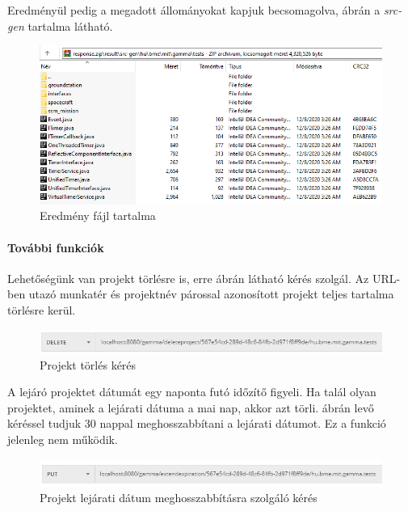 Eredményül pedig a megadott állományokat kapjuk becsomagolva,  ábrán a \textit{src-gen} tartalma látható. 

\begin{figure}[!ht]
	\includegraphics[width=150mm, keepaspectratio]{figures/result_zip.PNG}
	\caption{Eredmény fájl tartalma}
	\label{fig:result_zip}
\end{figure}
\paragraph{További funkciók} Lehetőségünk van projekt törlésre is, erre  ábrán látható kérés szolgál. Az URL-ben utazó munkatér és projektnév párossal azonosított projekt teljes tartalma törlésre kerül.


\begin{figure}[!ht]
	\includegraphics[width=\textwidth, keepaspectratio]{figures/delete_project_request.PNG}
	\caption{Projekt törlés kérés}
	\label{fig:delete_project_request}
\end{figure}

A lejáró projektet dátumát egy naponta futó időzítő figyeli. Ha talál olyan projektet, aminek a lejárati dátuma a mai nap, akkor azt törli.  ábrán levő kéréssel tudjuk 30 nappal meghosszabbítani a lejárati dátumot. Ez a funkció jelenleg nem működik.

\begin{figure}[!ht]
	\includegraphics[width=\textwidth, keepaspectratio]{figures/extend_expiration_req.PNG}
	\caption{Projekt lejárati dátum meghosszabbításra szolgáló kérés}
	\label{fig:extend_expiration_req}
\end{figure}